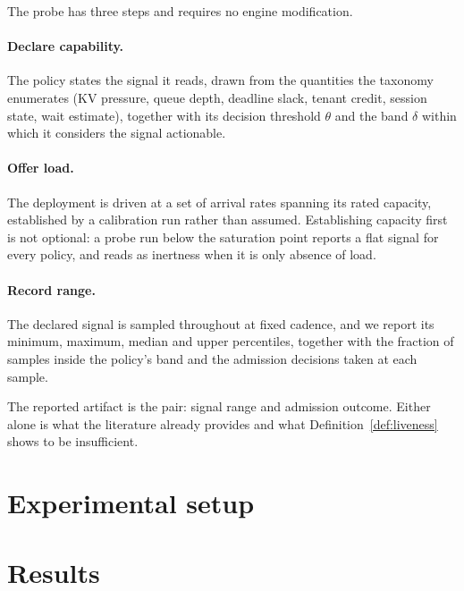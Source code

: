 The probe has three steps and requires no engine modification.

\paragraph{Declare capability.} The policy states the signal it reads, drawn
from the quantities the taxonomy enumerates (KV pressure, queue depth, deadline
slack, tenant credit, session state, wait estimate), together with its decision
threshold $\theta$ and the band $\delta$ within which it considers the signal
actionable.

\paragraph{Offer load.} The deployment is driven at a set of arrival rates
spanning its rated capacity, established by a calibration run rather than
assumed. Establishing capacity first is not optional: a probe run below the
saturation point reports a flat signal for every policy, and reads as inertness
when it is only absence of load.

\paragraph{Record range.} The declared signal is sampled throughout at fixed
cadence, and we report its minimum, maximum, median and upper percentiles,
together with the fraction of samples inside the policy's band and the admission
decisions taken at each sample.

The reported artifact is the pair: signal range and admission outcome. Either
alone is what the literature already provides and what
Definition~\ref{def:liveness} shows to be insufficient.

\section{Experimental setup}
\label{sec:setup}


\section{Results}
\label{sec:results}

